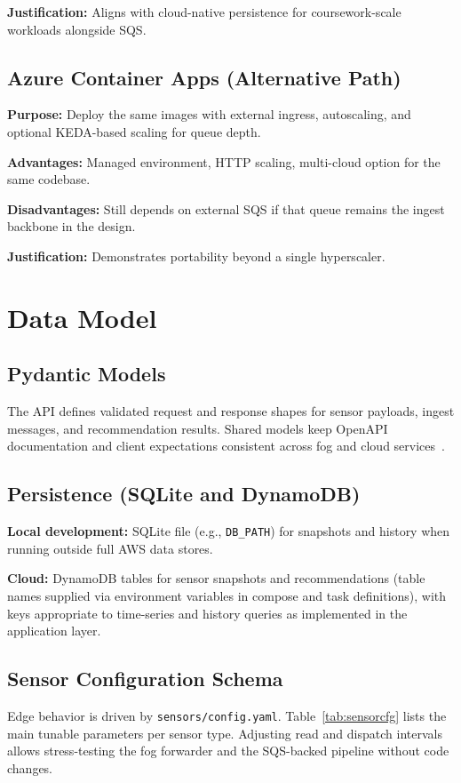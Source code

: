 \documentclass[conference]{IEEEtran}
\begin{document}
\textbf{Justification:} Aligns with cloud-native persistence for coursework-scale workloads alongside SQS.

\subsection{Azure Container Apps (Alternative Path)}
\textbf{Purpose:} Deploy the same images with external ingress, autoscaling, and optional KEDA-based scaling for queue depth.

\textbf{Advantages:} Managed environment, HTTP scaling, multi-cloud option for the same codebase.

\textbf{Disadvantages:} Still depends on external SQS if that queue remains the ingest backbone in the design.

\textbf{Justification:} Demonstrates portability beyond a single hyperscaler.

\section{Data Model}

\subsection{Pydantic Models}
The API defines validated request and response shapes for sensor payloads, ingest messages, and recommendation results. Shared models keep OpenAPI documentation and client expectations consistent across fog and cloud services~\cite{fastapi}.

\subsection{Persistence (SQLite and DynamoDB)}
\textbf{Local development:} SQLite file (e.g., \texttt{DB\_PATH}) for snapshots and history when running outside full AWS data stores.

\textbf{Cloud:} DynamoDB tables for sensor snapshots and recommendations (table names supplied via environment variables in compose and task definitions), with keys appropriate to time-series and history queries as implemented in the application layer.

\subsection{Sensor Configuration Schema}
Edge behavior is driven by \texttt{sensors/config.yaml}. Table~\ref{tab:sensorcfg} lists the main tunable parameters per sensor type. Adjusting read and dispatch intervals allows stress-testing the fog forwarder and the SQS-backed pipeline without code changes.
\end{document}
